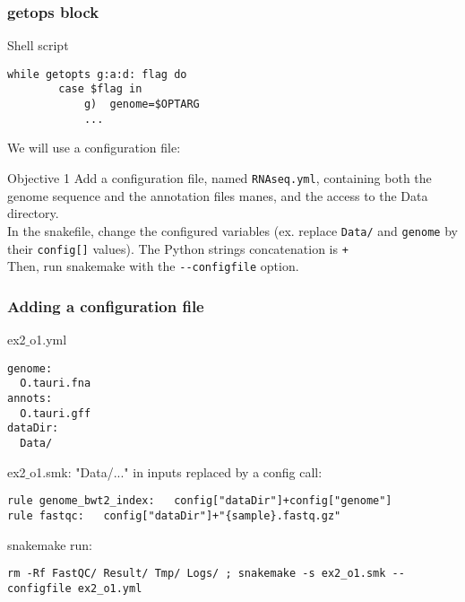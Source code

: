 \begin{frame}[containsverbatim]
\frametitle{getops block}
\begin{exampleblock}{Shell script}
\begin{lstlisting}
while getopts g:a:d: flag do
        case $flag in
            g)  genome=$OPTARG 
            ...
\end{lstlisting}
\end{exampleblock}
We will use a configuration file:
\begin{exampleblock}{Objective 1}
Add a configuration file, named \verb|RNAseq.yml|, containing both the genome sequence and the annotation files manes, and the access to the Data directory. \\
In the snakefile, change the configured variables (ex. replace \verb|Data/| and \verb|genome| by their \verb|config[]| values). The Python strings concatenation is \verb|+|\\
Then, run snakemake with the \verb|--configfile| option.
\end{exampleblock}
\end{frame}
\begin{frame}[containsverbatim]
\frametitle{Adding a configuration file}
\begin{exampleblock}{ex2$\_$o1.yml}
\begin{lstlisting}
genome:
  O.tauri.fna
annots:
  O.tauri.gff
dataDir:
  Data/
\end{lstlisting}
\end{exampleblock}
\begin{exampleblock}{ex2$\_$o1.smk: "Data/..." in inputs replaced by a config call:}
\begin{lstlisting}
rule genome_bwt2_index:   config["dataDir"]+config["genome"]
rule fastqc:   config["dataDir"]+"{sample}.fastq.gz"
\end{lstlisting}
\end{exampleblock}
\begin{exampleblock}{snakemake run:}
\begin{lstlisting}
rm -Rf FastQC/ Result/ Tmp/ Logs/ ; snakemake -s ex2_o1.smk --configfile ex2_o1.yml
\end{lstlisting}
\end{exampleblock}
\end{frame}
